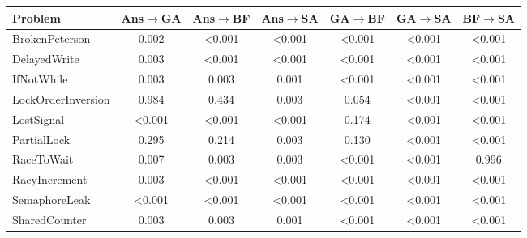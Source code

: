 \begin{table}[ht]
\small
\centering
\begin{tabular}{|l|c|c|c|c|c|c|}
\hline
\rowcolor{gray!25}
Problem & Ans$\rightarrow$GA & Ans$\rightarrow$BF & Ans$\rightarrow$SA & GA$\rightarrow$BF & GA$\rightarrow$SA & BF$\rightarrow$SA \\ \hline \hline
BrokenPeterson & \colorbox{green!25}{0.002} & \colorbox{green!25}{<0.001} & \colorbox{green!25}{<0.001} & \colorbox{green!25}{<0.001} & \colorbox{green!25}{<0.001} & \colorbox{green!25}{<0.001} \\ \hline
DelayedWrite & \colorbox{green!25}{0.003} & \colorbox{green!25}{<0.001} & \colorbox{green!25}{<0.001} & \colorbox{green!25}{<0.001} & \colorbox{green!25}{<0.001} & \colorbox{green!25}{<0.001} \\ \hline
IfNotWhile & \colorbox{green!25}{0.003} & \colorbox{green!25}{0.003} & \colorbox{green!25}{0.001} & \colorbox{green!25}{<0.001} & \colorbox{green!25}{<0.001} & \colorbox{green!25}{<0.001} \\ \hline
LockOrderInversion & \colorbox{red!25}{0.984} & \colorbox{gray!25}{0.434} & \colorbox{green!25}{0.003} & \colorbox{gray!25}{0.054} & \colorbox{green!25}{<0.001} & \colorbox{green!25}{<0.001} \\ \hline
LostSignal & \colorbox{green!25}{<0.001} & \colorbox{green!25}{<0.001} & \colorbox{green!25}{<0.001} & \colorbox{gray!25}{0.174} & \colorbox{green!25}{<0.001} & \colorbox{green!25}{<0.001} \\ \hline
PartialLock & \colorbox{gray!25}{0.295} & \colorbox{gray!25}{0.214} & \colorbox{green!25}{0.003} & \colorbox{gray!25}{0.130} & \colorbox{green!25}{<0.001} & \colorbox{green!25}{<0.001} \\ \hline
RaceToWait & \colorbox{green!25}{0.007} & \colorbox{green!25}{0.003} & \colorbox{green!25}{0.003} & \colorbox{green!25}{<0.001} & \colorbox{green!25}{<0.001} & \colorbox{red!25}{0.996} \\ \hline
RacyIncrement & \colorbox{green!25}{0.003} & \colorbox{green!25}{<0.001} & \colorbox{green!25}{<0.001} & \colorbox{green!25}{<0.001} & \colorbox{green!25}{<0.001} & \colorbox{green!25}{<0.001} \\ \hline
SemaphoreLeak & \colorbox{green!25}{<0.001} & \colorbox{green!25}{<0.001} & \colorbox{green!25}{<0.001} & \colorbox{green!25}{<0.001} & \colorbox{green!25}{<0.001} & \colorbox{green!25}{<0.001} \\ \hline
SharedCounter & \colorbox{green!25}{0.003} & \colorbox{green!25}{0.003} & \colorbox{green!25}{0.001} & \colorbox{green!25}{<0.001} & \colorbox{green!25}{<0.001} & \colorbox{green!25}{<0.001} \\ \hline

\end{tabular}
\end{table}
